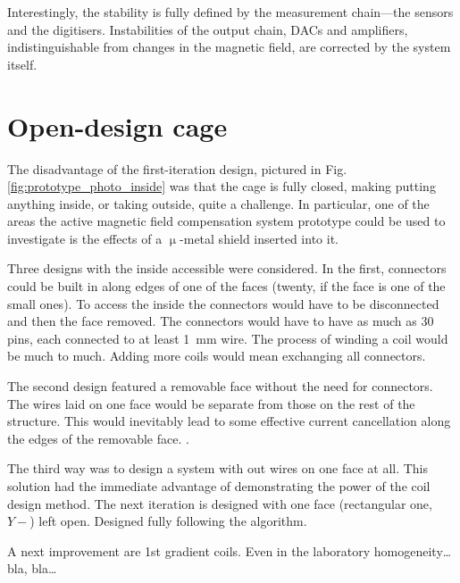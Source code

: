 Interestingly, the stability is fully defined by the measurement chain---the sensors and the digitisers. Instabilities of the output chain, DACs and amplifiers, indistinguishable from changes in the magnetic field, are corrected by the system itself.





\section{Open-design cage}
The disadvantage of the first-iteration design, pictured in Fig.\,\ref{fig:prototype_photo_inside} was that the cage is fully closed, making putting anything inside, or taking outside, quite a challenge. In particular, one of the areas the active magnetic field compensation system prototype could be used to investigate is the effects of a $\upmu$-metal shield inserted into it.

Three designs with the inside accessible were considered. In the first, connectors could be built in along edges of one of the faces (twenty, if the face is one of the small ones). To access the inside the connectors would have to be disconnected and then the face removed. The connectors would have to have as much as 30 pins, each connected to at least \SI{1}{\milli\meter} wire. 
 The process of winding a coil would be much to much.
Adding more coils would mean exchanging all connectors.

The second design featured a removable face without the need for connectors. The wires laid on one face would be separate from those on the rest of the structure. This would inevitably lead to some effective current cancellation along the edges of the removable face. .

The third way was to design a system with out wires on one face at all. This solution had the immediate advantage of demonstrating the power of the coil design method. The next iteration is designed with one face (rectangular one, $Y-$) left open. Designed fully following the algorithm.

A next improvement are 1st gradient coils. Even in the laboratory homogeneity\ldots bla, bla\ldots

